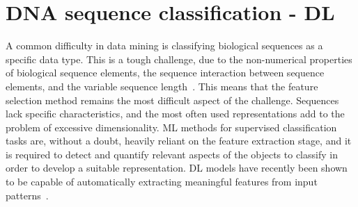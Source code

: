 
\section{DNA sequence classification - DL}

A common difficulty in data mining is classifying biological sequences as a specific data type. This is a tough challenge, due to the non-numerical properties of biological sequence elements, the sequence interaction between sequence elements, and the variable sequence length~\cite{Yang2020ReviewDNA}. This means that the feature selection method remains the most difficult aspect of the challenge. Sequences lack specific characteristics, and the most often used representations add to the problem of excessive dimensionality. \gls{ML} methods for supervised classification tasks are, without a doubt, heavily reliant on the feature extraction stage, and it is required to detect and quantify relevant aspects of the objects to classify in order to develop a suitable representation. \gls{DL} models have recently been shown to be capable of automatically extracting meaningful features from input patterns~\cite{LoBosco2017DeepClassification}.

